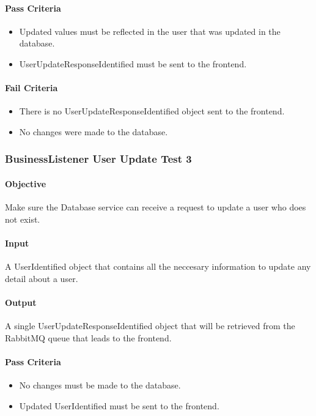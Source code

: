 \documentclass[hidelinks,english]{article}
\begin{document}
				\paragraph{Pass Criteria}
				\begin{itemize}
					\item Updated values must be reflected in the user that was updated in the database.
					\item UserUpdateResponseIdentified must be sent to the frontend.
				\end{itemize}
				\paragraph{Fail Criteria}
				\begin{itemize}
					\item There is no UserUpdateResponseIdentified object sent to the frontend.
					\item No changes were made to the database.
				\end{itemize}
			
			\subsubsection{BusinessListener User Update Test 3}\label{databasebusinesslistenerupdatetest4}
				\paragraph{Objective} Make sure the Database service can receive a request to update a user who does not exist.
				\paragraph{Input} A UserIdentified object that contains all the neccesary information to update any detail about a user.
				\paragraph{Output} A single UserUpdateResponseIdentified object that will be retrieved from the RabbitMQ queue that leads to the frontend.
				\paragraph{Pass Criteria}
				\begin{itemize}
					\item No changes must be made to the database.
					\item Updated UserIdentified must be sent to the frontend.
				\end{itemize}
\end{document}
